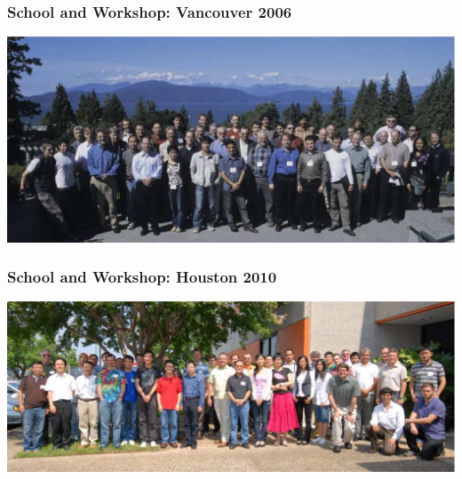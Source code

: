 \begin{frame}
  \frametitle{School and Workshop: Vancouver 2006}
  \includegraphics[width=\textwidth]{Fig/RSF2006}
\end{frame}

\begin{frame}
  \frametitle{School and  Workshop: Houston 2010}
  \includegraphics[width=\textwidth]{Fig/RSF2010}
\end{frame}



